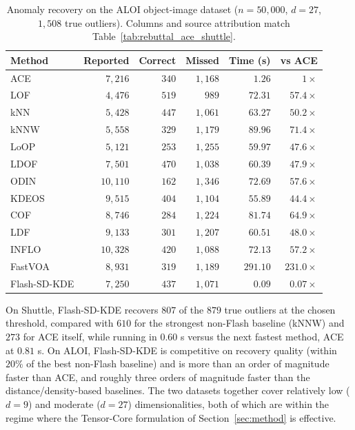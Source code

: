\begin{table}[t]
  \centering
  \small
  \setlength{\tabcolsep}{4pt}
  \begin{tabular}{lrrrrr}
    \toprule
    Method        & Reported & Correct & Missed  & Time (s) & vs ACE \\
    \midrule
    ACE           & $7{,}216$  & $340$ & $1{,}168$ & $1.26$   & $1\times$    \\
    LOF           & $4{,}476$  & $519$ & $989$     & $72.31$  & $57.4\times$ \\
    kNN           & $5{,}428$  & $447$ & $1{,}061$ & $63.27$  & $50.2\times$ \\
    kNNW          & $5{,}558$  & $329$ & $1{,}179$ & $89.96$  & $71.4\times$ \\
    LoOP          & $5{,}121$  & $253$ & $1{,}255$ & $59.97$  & $47.6\times$ \\
    LDOF          & $7{,}501$  & $470$ & $1{,}038$ & $60.39$  & $47.9\times$ \\
    ODIN          & $10{,}110$ & $162$ & $1{,}346$ & $72.69$  & $57.6\times$ \\
    KDEOS         & $9{,}515$  & $404$ & $1{,}104$ & $55.89$  & $44.4\times$ \\
    COF           & $8{,}746$  & $284$ & $1{,}224$ & $81.74$  & $64.9\times$ \\
    LDF           & $9{,}133$  & $301$ & $1{,}207$ & $60.51$  & $48.0\times$ \\
    INFLO         & $10{,}328$ & $420$ & $1{,}088$ & $72.13$  & $57.2\times$ \\
    FastVOA       & $8{,}931$  & $319$ & $1{,}189$ & $291.10$ & $231.0\times$ \\
    Flash-SD-KDE  & $7{,}250$  & $437$ & $1{,}071$ & $0.09$   & $0.07\times$ \\
    \bottomrule
  \end{tabular}
  \caption{Anomaly recovery on the ALOI object-image dataset
           ($n=50{,}000$, $d=27$, $1{,}508$ true outliers).
           Columns and source attribution match
           Table~\ref{tab:rebuttal_ace_shuttle}.}
  \label{tab:rebuttal_ace_aloi}
\end{table}

On Shuttle, Flash-SD-KDE recovers $807$ of the $879$ true outliers at the
chosen threshold, compared with $610$ for the strongest non-Flash baseline
(kNNW) and $273$ for ACE itself, while running in $0.60$ s versus the next
fastest method, ACE at $0.81$ s.
On ALOI, Flash-SD-KDE is competitive on recovery quality (within $20\%$ of
the best non-Flash baseline) and is more than an order of magnitude faster
than ACE, and roughly three orders of magnitude faster than the
distance/density-based baselines.
The two datasets together cover relatively low ($d=9$) and moderate ($d=27$)
dimensionalities, both of which are within the regime where the Tensor-Core
formulation of Section~\ref{sec:method} is effective.

